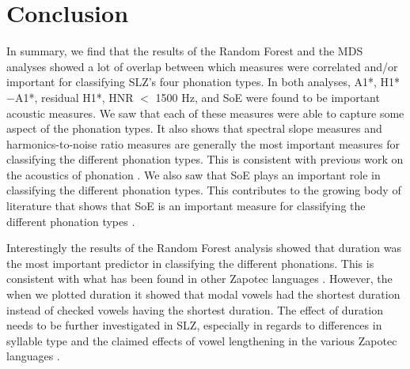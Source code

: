 \section{Conclusion} \label{sec:dt_conclusion}


In summary, we find that the results of the Random Forest and the MDS analyses showed a lot of overlap between which measures were correlated and/or important for classifying SLZ's four phonation types. In both analyses, A1*, H1*$-$A1*, residual H1*, HNR $<$ 1500 Hz, and SoE were found to be important acoustic measures. We saw that each of these measures were able to capture some aspect of the phonation types. It also shows that spectral slope measures and harmonics-to-noise ratio measures are generally the most important measures for classifying the different phonation types. This is consistent with previous work on the acoustics of phonation \citep[e.g.,][]{garellekPhoneticsVoice2019}. We also saw that SoE plays an important role in classifying the different phonation types. This contributes to the growing body of literature that shows that SoE is an important measure for classifying the different phonation types \citep{chaiPhoneticsGlottalizedPhonations2023,garellekVoicingGlottalConsonants2021,wellerInteractionsToneGlottalization2023,wellerLexicalToneVowel2023,wellerVoiceQualityTone2024}.

Interestingly the results of the Random Forest analysis showed that duration was the most important predictor in classifying the different phonations. This is consistent with what has been found in other Zapotec languages \citep[e.g.,][]{barzilaiContextdependentPhoneticEnhancement2021,chaiPerceptionCheckedRearticulated2025,chavez-peonInteractionMetricalStructure2010}. However, the when we plotted duration it showed that modal vowels had the shortest duration instead of checked vowels having the shortest duration. The effect of duration needs to be further investigated in SLZ, especially in regards to differences in syllable type and the claimed effects of vowel lengthening in the various Zapotec languages \citep[e.g.,][]{chavez-peonInteractionMetricalStructure2010,merrillTilquiapanZapotec2008,nellisFortisLenisCajonos1980,pickettIsthmusJuchitanZapotec2010,uchiharaFortisLenisGlides2016}.




